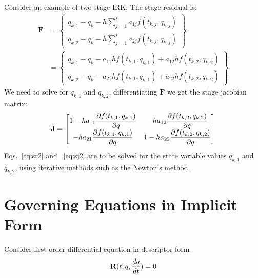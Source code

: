 \documentclass[pdftex,11pt,letter]{article}
\begin{document}
Consider an example of two-stage IRK. The stage residual is:
\begin{equation}\label{eq:sr2}
  \begin{split}
    \mathbf{F} & = \left\{
    \begin{array}{rr} q_{k,1} - q_{k} - h \sum_{j=1}^s a_{1j} f(t_{k,j}, q_{k,j}) \\
      q_{k,2} - q_{k} - h \sum_{j=1}^s a_{2j} f(t_{k,j}, q_{k,j})
    \end{array} \right\}\\
    & = \left\{
    \begin{array}{rr} q_{k,1} - q_{k} -  a_{11} h f(t_{k,1}, q_{k,1}) + a_{12} h f(t_{k,2}, q_{k,2})\\
      q_{k,2} - q_{k} - a_{21} h f(t_{k,1}, q_{k,1}) + a_{22} h f(t_{k,2}, q_{k,2})
    \end{array} \right\}
  \end{split}
\end{equation}
We need to solve for $q_{k,1}$ and $q_{k,2}$, differentiating $\mathbf{F}$ we get
the stage jacobian matrix:
\begin{equation}\label{eq:sj2}
  \mathbf{J} =  \begin{bmatrix}
    1 - h a_{11} \dfrac{\partial f(t_{k,1}, q_{k,1})}{\partial q} & - h a_{12} \dfrac{\partial f(t_{k,2}, q_{k,2})}{\partial q}\\
    - h a_{21} \dfrac{\partial f(t_{k,1}, q_{k,1})}{\partial q}   & 1 - h a_{22} \dfrac{\partial f(t_{k,2}, q_{k,2})}{\partial q}
  \end{bmatrix}
\end{equation}
Eqs.~\eqref{eq:sr2} and ~\eqref{eq:sj2} are to be solved for the state
variable values $q_{k,1}$ and $q_{k,2}$, using iterative methods such as the
Newton's method.


\section{Governing Equations in Implicit Form}

Consider first order differential equation in descriptor form
\begin{equation}
  \mathbf{R}(t, q, \dfrac{d q}{d t}) = 0
\end{equation}
\end{document}
